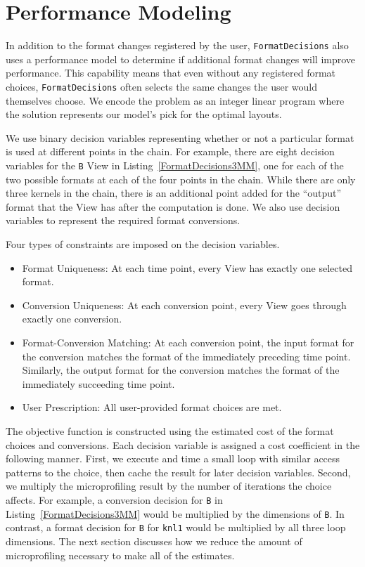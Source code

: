 \documentclass[sigconf, table]{acmart}
\begin{document}
\section{Performance Modeling}

In addition to the format changes registered by the user, \verb.FormatDecisions. also uses a performance model to determine if additional format changes will improve performance. 
This capability means that even without any registered format choices, \verb.FormatDecisions. often selects the same changes the user would themselves choose. 
We encode the problem as an integer linear program where the solution represents our model's pick for the optimal layouts.


We use binary decision variables representing whether or not a particular format is used at different points in the chain. 
For example, there are eight decision variables for the \verb.B. View in Listing~\ref{FormatDecisions3MM}, one for each of the two possible formats at each of the four points in the chain. 
While there are only three kernels in the chain, there is an additional point added for the \enquote{output} format that the View has after the computation is done. 
We also use decision variables to represent the required format conversions.

Four types of constraints are imposed on the decision variables.
\begin{itemize}
\item Format Uniqueness: At each time point, every View has exactly one selected format. 
\item Conversion Uniqueness: At each conversion point, every View goes through exactly one conversion.
\item Format-Conversion Matching: At each conversion point, the input format for the conversion matches the format of the immediately preceding time point. Similarly, the output format for the conversion matches the format of the immediately succeeding time point.
\item User Prescription: All user-provided format choices are met.
\end{itemize}

The objective function is constructed using the estimated cost of the format choices and conversions. 
Each decision variable is assigned a cost coefficient in the following manner.
First, we execute and time a small loop with similar access patterns to the choice, then cache the result for later decision variables.
Second, we multiply the microprofiling result by the number of iterations the choice affects.
For example, a conversion decision for \verb.B. in Listing~\ref{FormatDecisions3MM} would be multiplied by the dimensions of \verb.B..
In contrast, a format decision for \verb.B. for \verb.knl1. would be multiplied by all three loop dimensions. 
The next section discusses how we reduce the amount of microprofiling necessary to make all of the estimates.
\end{document}
